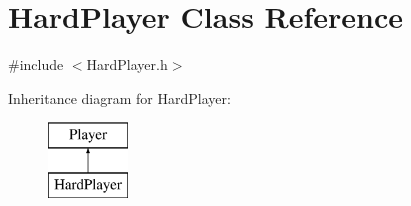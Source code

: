 \hypertarget{class_hard_player}{}\section{Hard\+Player Class Reference}
\label{class_hard_player}


{\ttfamily \#include $<$Hard\+Player.\+h$>$}

Inheritance diagram for Hard\+Player\+:\begin{figure}[H]
\begin{center}
\leavevmode
\includegraphics[height=2.000000cm]{class_hard_player}
\end{center}
\end{figure}
